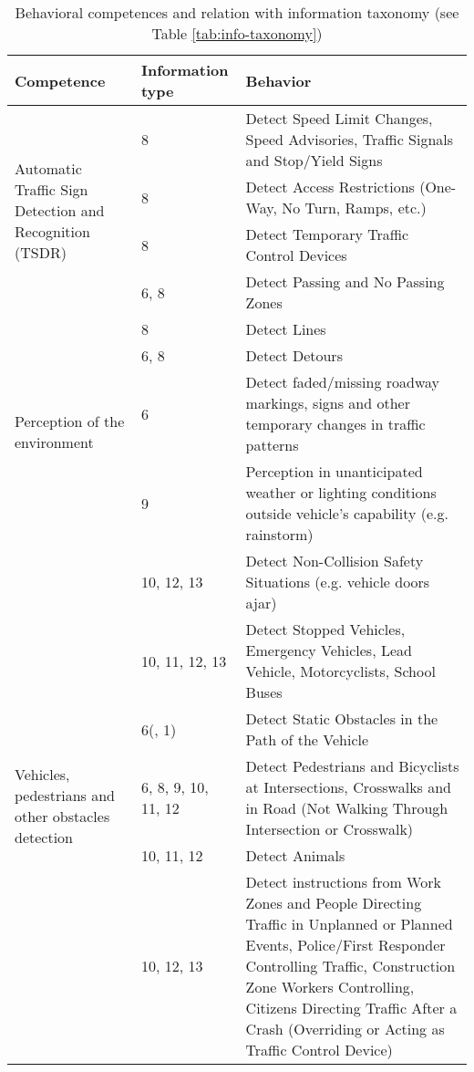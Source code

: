 \begin{table*} %
    \caption{Behavioral competences and relation with information taxonomy 
        (see Table \ref{tab:info-taxonomy})}
    \label{tab:behavioral-competences}
    \begin{tabular*}{\textwidth}{m{4cm} l p{11cm}}%
        \hline %
        \textbf{Competence}	& \textbf{Information type} & \textbf{Behavior}	
        \\
        \hline %
        \multirow{4}{4cm}{Automatic Traffic Sign Detection
                         and Recognition (TSDR)}
         & 8    & Detect Speed Limit Changes, Speed Advisories, Traffic Signals 
         and Stop/Yield Signs \\
         & 8    & Detect Access Restrictions (One-Way, No Turn, Ramps, etc.) \\
         & 8    & Detect Temporary Traffic Control Devices \\
         & 6, 8 & Detect Passing and No Passing Zones  \\
         \hline %
         \multirow{4}{*}{Perception of the environment}
         & 8 & Detect Lines \\
         & 6, 8 & Detect Detours  \\
         & 6 & Detect faded/missing roadway markings, signs and other 
         temporary changes in traffic patterns \\
         & 9 & Perception in unanticipated weather or lighting conditions 
         outside 
         vehicle’s capability (e.g. rainstorm) \\
         \hline %
         \multirow{6}{4cm}{Vehicles, pedestrians and other obstacles 
         detection}
         & 10, 12, 13 & Detect Non-Collision Safety Situations (e.g. vehicle 
         doors ajar) \\
         & 10, 11, 12, 13 & Detect Stopped Vehicles, Emergency Vehicles, Lead 
         Vehicle, Motorcyclists, School Buses \\
         & 6(, 1)  & Detect Static Obstacles in the Path of the Vehicle \\
         & 6, 8, 9, 10, 11, 12 & Detect Pedestrians and Bicyclists at 
         Intersections, Crosswalks and in Road (Not Walking Through 
         Intersection or Crosswalk) \\
         & 10, 11, 12 & Detect Animals \\
         & 10, 12, 13 & Detect instructions from Work Zones and People 
         Directing Traffic in Unplanned or Planned Events, Police/First 
         Responder Controlling Traffic, Construction Zone Workers Controlling, 
         Citizens Directing Traffic After a Crash (Overriding or Acting as 
         Traffic Control Device) \\

        \hline %
    \end{tabular*}
\end{table*}
